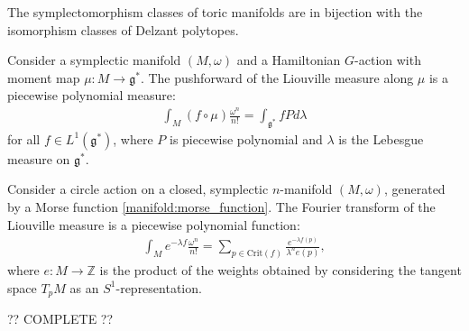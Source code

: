     \begin{theorem}[Delzant]
        The symplectomorphism classes of toric manifolds are in bijection with the isomorphism classes of Delzant polytopes.
    \end{theorem}

    \begin{theorem}
        Consider a symplectic manifold $(M,\omega)$ and a Hamiltonian $G$-action with moment map $\mu:M\rightarrow\mathfrak{g}^*$. The pushforward of the Liouville measure along $\mu$ is a piecewise polynomial measure:
        \begin{gather}
            \int_M (f\circ\mu)\frac{\omega^n}{n!} = \int_{\mathfrak{g}^*}fPd\lambda
        \end{gather}
        for all $f\in L^1(\mathfrak{g}^*)$, where $P$ is piecewise polynomial and $\lambda$ is the Lebesgue measure on $\mathfrak{g}^*$.
    \end{theorem}
    \begin{result}[Localization]
        Consider a circle action on a closed, symplectic $n$-manifold $(M,\omega)$, generated by a Morse function \ref{manifold:morse_function}. The Fourier transform of the Liouville measure is a piecewise polynomial function:
        \begin{gather}
            \int_Me^{-\lambda f}\frac{\omega^n}{n!} = \sum_{p\in\mathrm{Crit}(f)}\frac{e^{-\lambda f(p)}}{\lambda^n e(p)},
        \end{gather}
        where $e:M\rightarrow\mathbb{Z}$ is the product of the weights obtained by considering the tangent space $T_pM$ as an $S^1$-representation.
    \end{result}

    ?? COMPLETE ??

